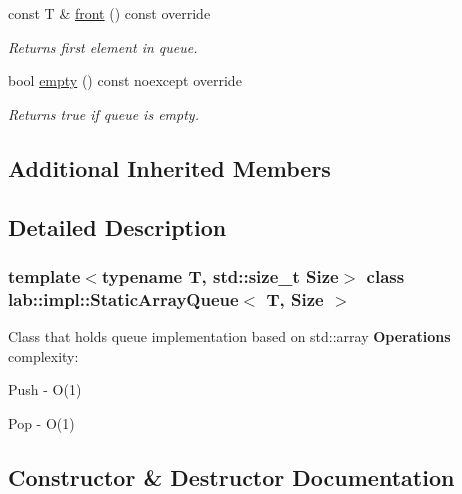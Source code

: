 \begin{DoxyCompactItemize}
const T \& \hyperlink{classlab_1_1impl_1_1StaticArrayQueue_adbf6d2a433d6dcf637fadfd555df4dbd}{front} () const override
\begin{DoxyCompactList}\small\item\em Returns first element in queue. \end{DoxyCompactList}\item 
\mbox{\label{classlab_1_1impl_1_1StaticArrayQueue_ad4488385381fe0920676ce45e221e4b5}} 
bool \hyperlink{classlab_1_1impl_1_1StaticArrayQueue_ad4488385381fe0920676ce45e221e4b5}{empty} () const noexcept override
\begin{DoxyCompactList}\small\item\em Returns true if queue is empty. \end{DoxyCompactList}\end{DoxyCompactItemize}
\subsection*{Additional Inherited Members}


\subsection{Detailed Description}
\subsubsection*{template$<$typename T, std\+::size\+\_\+t Size$>$\newline
class lab\+::impl\+::\+Static\+Array\+Queue$<$ T, Size $>$}

Class that holds queue implementation based on std\+::array {\bfseries Operations} complexity\+: 

\begin{DoxyItemize}
\item Push -\/ O(1) \item Pop -\/ O(1) \end{DoxyItemize}


\subsection{Constructor \& Destructor Documentation}
\mbox{\label{classlab_1_1impl_1_1StaticArrayQueue_a8c77c1506a3fdc3c4b0ccd41aa7352ff}} 
